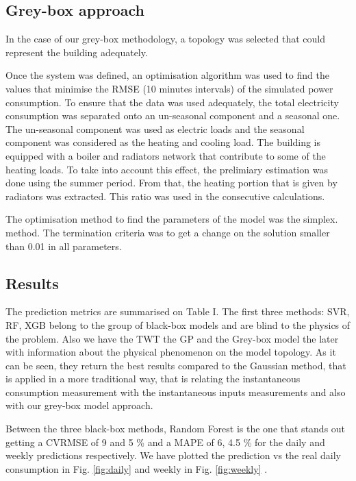 \documentclass[10pt, conference, compsocconf]{IEEEtran}
\begin{document}
\subsection{Grey-box approach}

In the case of our grey-box methodology, a topology was selected that could represent the building adequately.


Once the system was defined, an optimisation algorithm was used to find the values that minimise the RMSE (10 minutes intervals) of the simulated power consumption. To ensure that the data was used adequately, the total electricity consumption was separated onto an un-seasonal component and a seasonal one. The un-seasonal component was used as electric loads and the seasonal component was considered as the heating and cooling load. The building is equipped with a boiler and radiators network that contribute to some of the heating loads. To take into account this effect, the prelimiary estimation was done using the summer period. From that, the heating portion that is given by radiators was extracted. This ratio was used in the consecutive calculations.

The optimisation method to find the parameters of the model was the simplex. method. The termination criteria was to get a change on the solution smaller than 0.01 in all parameters. %


\subsection{Results}

The prediction metrics are summarised on Table I. The first three methods: SVR, RF, XGB  belong to the group of black-box models and are blind to the physics of the problem. Also we have the TWT the GP and the Grey-box model the later with information about the physical phenomenon on the model topology. As it can be seen, they return the best results compared to the Gaussian method, that is applied in a more traditional way, that is relating the instantaneous consumption measurement with the instantaneous inputs measurements and also with our grey-box model approach. 

Between the three black-box methods, Random Forest is the one that stands out getting a CVRMSE of 9 and 5 \%  and a MAPE of 6, 4.5 \% for the daily and weekly predictions respectively. We have plotted the prediction vs the real daily consumption in Fig. \ref{fig:daily} and weekly in Fig. \ref{fig:weekly} .
\end{document}
